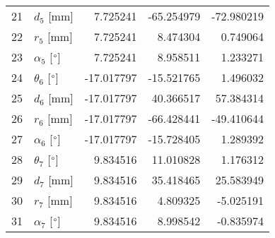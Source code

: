 \documentclass{standalone}%
\begin{document}
\begin{tabular}{llrrr}
21 &              $d_{5}$ [mm] &   7.725241 &  -65.254979 &  -72.980219 \\
22 &              $r_{5}$ [mm] &   7.725241 &    8.474304 &    0.749064 \\
23 &  $\alpha_{5}$ [$\degree$] &   7.725241 &    8.958511 &    1.233271 \\
24 &  $\theta_{6}$ [$\degree$] & -17.017797 &  -15.521765 &    1.496032 \\
25 &              $d_{6}$ [mm] & -17.017797 &   40.366517 &   57.384314 \\
26 &              $r_{6}$ [mm] & -17.017797 &  -66.428441 &  -49.410644 \\
27 &  $\alpha_{6}$ [$\degree$] & -17.017797 &  -15.728405 &    1.289392 \\
28 &  $\theta_{7}$ [$\degree$] &   9.834516 &   11.010828 &    1.176312 \\
29 &              $d_{7}$ [mm] &   9.834516 &   35.418465 &   25.583949 \\
30 &              $r_{7}$ [mm] &   9.834516 &    4.809325 &   -5.025191 \\
31 &  $\alpha_{7}$ [$\degree$] &   9.834516 &    8.998542 &   -0.835974 \\
\bottomrule
\end{tabular}
%
\end{document}
